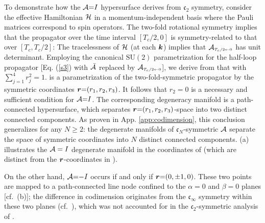 \documentclass[aps, showpacs, twocolumn, notitlepage, superscriptaddress]{revtex4-1}
\begin{document}
To demonstrate how the ${\cal A}{=}I$ hypersurface derives from $\mathfrak{c}_2$ symmetry, consider  the effective Hamiltonian ${\cal H}$ 
in a momentum-independent basis where the Pauli matrices correspond to spin operators. The two-fold rotational symmetry 
implies that the propagator over the time interval $[T_c/2,0]$ is symmetry-related to that over $[T_c,T_c/2]$:
The tracelessness of ${\cal H}$ (at each $\boldsymbol{k}$) implies that  ${{\cal A}}_{\scriptscriptstyle{T_c/2\leftarrow 0}}$  has unit determinant. Employing the canonical $\text{SU}(2)$ parametrization for the half-loop propagator [Eq. (\ref{s3}) with ${\cal \bar{A}}$ replaced by ${{\cal A}}_{\scriptscriptstyle{T_c/2\leftarrow 0}}$], we derive from  that
with $\sum_{j=1}^4r_j^2{=}1$.  is a parametrization of the two-fold-symmetric propagator by the symmetric coordinates $\boldsymbol{r}{=}(r_1,r_2,r_3)$. It follows that $r_2{=}0$ is a necessary and sufficient condition for ${\cal A}{=}I$. The corresponding degeneracy manifold is a path-connected hypersurface, which separates $\boldsymbol{r}{=}(r_1,r_2,r_3)$-space into two distinct connected components. As proven in App. \ref{app:codimension}, this conclusion generalizes for any $N{\geq}2$: the degenerate manifolds of $\mathfrak{c}_N$-symmetric ${\cal A}$ separate the space of symmetric coordinates into $N$ distinct connected components. (a) illustrates the ${\cal A}=I$ degenerate manifold {in the coordinates of   (which are distinct from the $\boldsymbol{r}$-coordinates in ).} 

On the other hand, ${\cal A}{=}{-}I$ occurs if and only if $\boldsymbol{r}{=}(0,{\pm} 1,0)$. These two points are mapped to a path-connected line node confined to the $\alpha{=}0$ and $\beta{=}0$ planes [cf.\ (b)]; the difference in codimension originates from the $\mathfrak{c}_{\infty}$ symmetry within these two planes (cf.\ ), which was not accounted for in the $\mathfrak{c}_2$-symmetric analysis of .

\end{document}
